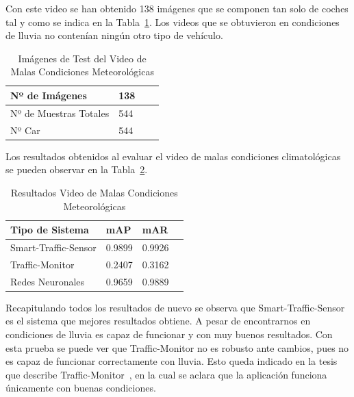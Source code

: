 Con este video se han obtenido 138 imágenes que se componen tan solo de coches tal y como se indica en la Tabla~\ref{tabla_video_malas_condiciones}. Los videos que se obtuvieron en condiciones de lluvia no contenían ningún otro tipo de vehículo.

\begin{table}[htbp]
\begin{center}
\begin{tabular}{|l|l|l|l|}
\hline
Nº de Imágenes  & 138 \\
\hline \hline
Nº de Muestras Totales & 544\\ \hline
Nº Car & 544 \\ \hline
\end{tabular}
\caption{Imágenes de Test del Video de Malas Condiciones Meteorológicas}
\label{tabla_video_malas_condiciones}
\end{center}
\end{table}

Los resultados obtenidos al evaluar el video de malas condiciones climatológicas se pueden observar en la Tabla~\ref{resultados_video_malas_condiciones}.

\begin{table}[htbp]
\begin{center}
\begin{tabular}{|l|l|l|l|}
\hline
Tipo de Sistema & mAP & mAR  \\ 
\hline \hline
Smart-Traffic-Sensor & 0.9899 & 0.9926 \\ \hline
Traffic-Monitor & 0.2407 & 0.3162 \\ \hline
Redes Neuronales & 0.9659 & 0.9889\\ \hline
\end{tabular}
\caption{Resultados Video de Malas Condiciones Meteorológicas}
\label{resultados_video_malas_condiciones}
\end{center}
\end{table}

Recapitulando todos los resultados de nuevo se observa que Smart-Traffic-Sensor es el sistema que mejores resultados obtiene. A pesar de encontrarnos en condiciones de lluvia es capaz de funcionar y con muy buenos resultados. Con esta prueba se puede ver que Traffic-Monitor no es robusto ante cambios, pues no es capaz de funcionar correctamente con lluvia. Esto queda indicado en la tesis que describe Traffic-Monitor~\cite{redo_tesis}, en la cual se aclara que la aplicación funciona únicamente con buenas condiciones.

